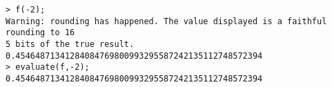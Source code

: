 \begin{center}\begin{minipage}{15cm}\begin{Verbatim}[frame=single]
> f(-2);
Warning: rounding has happened. The value displayed is a faithful rounding to 16
5 bits of the true result.
0.45464871341284084769800993295587242135112748572394
> evaluate(f,-2);
0.45464871341284084769800993295587242135112748572394
\end{Verbatim}
\end{minipage}\end{center}
